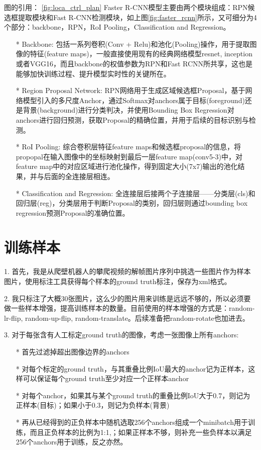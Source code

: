 \documentclass[UTF8]{ctexart}
\begin{document}
图的引用： \ref{fig:loca_ctrl_plan} 
Faster R-CNN模型主要由两个模块组成：RPN候选框提取模块和Fast R-CNN检测模块，如上图\ref{fig:faster_rcnn}所示，又可细分为4个部分：backbone，RPN，RoI Pooling，Classification and Regression。
\begin{itemize}
\item[*] Backbone: 包括一系列卷积(Conv + Relu)和池化(Pooling)操作，用于提取图像的特征(feature maps)，一般直接使用现有的经典网络模型resnet, inception或者VGG16，而且backbone的权值参数为RPN和Fast RCNN所共享，这也是能够加快训练过程、提升模型实时性的关键所在。
\item[*] Region Proposal Network: RPN网络用于生成区域候选框Proposal，基于网络模型引入的多尺度Anchor，通过Softmax对anchors属于目标(foreground)还是背景(background)进行分类判决，并使用Bounding Box Regression对anchors进行回归预测，获取Proposal的精确位置，并用于后续的目标识别与检测。
\item[*] RoI Pooling: 综合卷积层特征feature maps和候选框proposal的信息，将propopal在输入图像中的坐标映射到最后一层feature map(conv5-3)中，对feature map中的对应区域进行池化操作，得到固定大小(7x7)输出的池化结果，并与后面的全连接层相连。
\item[*] Classification and Regression: 全连接层后接两个子连接层——分类层(cls)和回归层(reg)，分类层用于判断Proposal的类别，回归层则通过bounding box regression预测Proposal的准确位置。
\end{itemize}

\section{训练样本}
1. 首先，我是从爬壁机器人的攀爬视频的解帧图片序列中挑选一些图片作为样本图片，使用标注工具获得每个样本的ground truth标注，保存为xml格式。

2. 我只标注了大概30张图片，这么少的图片用来训练是远远不够的，所以必须要做一些样本增强，提高训练样本的数量。目前使用的样本增强的方式是：random-lr-flip, random-up-flip, random-translate。后续准备把random-rotate也加进去。

3. 对于每张含有人工标定ground truth的图像，考虑一张图像上所有anchors:
\begin{itemize}
\item[*] 首先过滤掉超出图像边界的anchors
\item[*] 对每个标定的ground truth，与其重叠比例IoU最大的anchor记为正样本，这样可以保证每个ground truth至少对应一个正样本anchor
\item[*] 对每个anchor，如果其与某个ground truth的重叠比例IoU大于0.7，则记为正样本(目标)；如果小于0.3，则记为负样本(背景)
\item[*] 再从已经得到的正负样本中随机选取256个anchors组成一个minibatch用于训练，而且正负样本的比例为1:1,；如果正样本不够，则补充一些负样本以满足256个anchors用于训练，反之亦然。
\end{itemize}
\end{document}
